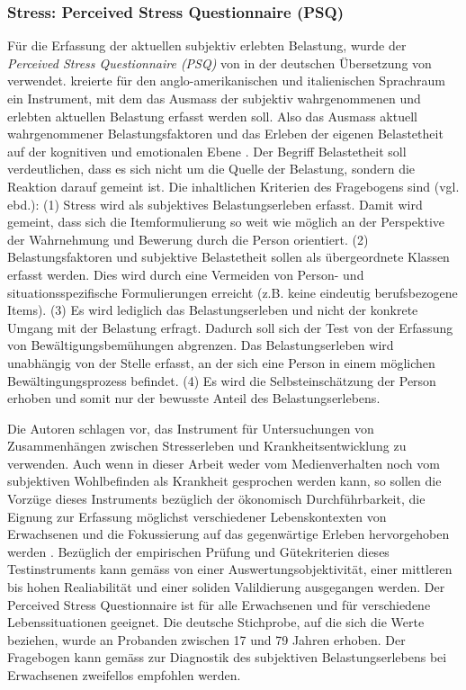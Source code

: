 \subsubsection{Stress: Perceived Stress Questionnaire (PSQ)}\label{sec:PSQ}
Für die Erfassung der aktuellen subjektiv erlebten Belastung, wurde der \textit{Perceived Stress Questionnaire (PSQ)} von  in der deutschen Übersetzung von  verwendet.
 kreierte für den anglo-amerikanischen und italienischen Sprachraum ein Instrument, mit dem das Ausmass der subjektiv wahrgenommenen und erlebten aktuellen Belastung erfasst werden soll. Also das Ausmass aktuell wahrgenommener Belastungsfaktoren und das Erleben der eigenen Belastetheit auf der kognitiven und emotionalen Ebene \cite{Fliege2001}. Der Begriff Belastetheit soll verdeutlichen, dass es sich nicht um die Quelle der Belastung, sondern die Reaktion darauf gemeint ist. Die inhaltlichen Kriterien des Fragebogens sind (vgl. ebd.): (1) Stress wird als subjektives Belastungserleben erfasst. Damit wird gemeint, dass sich die Itemformulierung so weit wie möglich an der Perspektive der Wahrnehmung und Bewerung durch die Person orientiert. (2) Belastungsfaktoren und subjektive Belastetheit sollen als übergeordnete Klassen erfasst werden. Dies wird durch eine Vermeiden von Person- und situationsspezifische Formulierungen erreicht (z.B. keine eindeutig berufsbezogene Items). (3) Es wird lediglich das Belastungserleben und nicht der konkrete Umgang mit der Belastung erfragt. Dadurch soll sich der Test von der Erfassung von Bewältigungsbemühungen abgrenzen. Das Belastungserleben wird unabhängig von der Stelle erfasst, an der sich eine Person in einem möglichen Bewältingungsprozess befindet. (4) Es wird die Selbsteinschätzung der Person erhoben und somit nur der bewusste Anteil des Belastungserlebens.

Die Autoren  schlagen vor, das Instrument für Untersuchungen von Zusammenhängen zwischen Stresserleben und Krankheitsentwicklung zu verwenden. Auch wenn in dieser Arbeit weder vom Medienverhalten noch vom subjektiven Wohlbefinden als Krankheit gesprochen werden kann, so sollen die Vorzüge dieses Instruments bezüglich der ökonomisch Durchführbarkeit, die Eignung zur Erfassung möglichst verschiedener Lebenskontexten von Erwachsenen und die Fokussierung auf das gegenwärtige Erleben hervorgehoben werden \cite{Fliege2001}. Bezüglich der empirischen Prüfung und Gütekriterien dieses Testinstruments kann gemäss  von einer Auswertungsobjektivität, einer mittleren bis hohen Realiabilität und einer soliden Valildierung ausgegangen werden. Der Perceived Stress Questionnaire \cite{Fliege2001} ist für alle Erwachsenen und für verschiedene Lebenssituationen geeignet. Die deutsche Stichprobe, auf die sich die Werte beziehen, wurde an Probanden zwischen 17 und 79 Jahren erhoben. Der Fragebogen kann gemäss  zur Diagnostik des subjektiven Belastungserlebens bei Erwachsenen zweifellos empfohlen werden.

